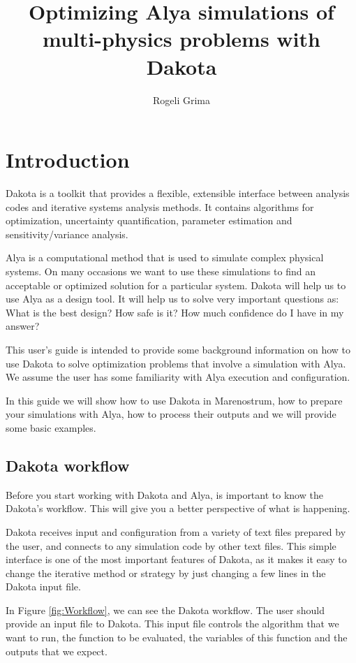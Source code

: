 \documentclass[12pt,a4paper,article]{memoir} %
\title{Optimizing Alya simulations of multi-physics problems with Dakota}
\author{Rogeli Grima}
\begin{document}
\maketitle
\tableofcontents*

\chapter{Introduction}

Dakota is a toolkit that provides a flexible, extensible interface between analysis codes and iterative systems analysis methods. It contains algorithms for optimization, uncertainty quantification, parameter estimation and sensitivity/variance analysis.

Alya is a computational method that is used to simulate complex physical systems. On many occasions we want to use these simulations to find an acceptable or optimized solution for a particular system. Dakota will help us to use Alya as a design tool. It will help us to solve very important questions as: What is the best design? How safe is it? How much confidence do I have in my answer?

This user's guide is intended to provide some background information on how to use Dakota to solve optimization problems that involve a simulation with Alya. We assume the user has some familiarity with Alya execution and configuration.

In this guide we will show how to use Dakota in Marenostrum, how to prepare your simulations with Alya, how to process their outputs and we will provide some basic examples.

\section{Dakota workflow}

Before you start working with Dakota and Alya, is important to know the Dakota's workflow. This will give you a better perspective of what is happening.

Dakota receives input and configuration from a variety of text files prepared by the user, and connects to any simulation code by other text files. This simple interface is one of the most important features of Dakota, as it makes it easy to change the iterative method or strategy by just changing a few lines in the Dakota input file.

In Figure \ref{fig:Workflow}, we can see the Dakota workflow. The user should provide an input file to Dakota. This input file controls the algorithm that we want to run, the function to be evaluated, the variables of this function and the outputs that we expect.
\end{document}
